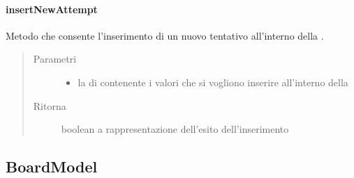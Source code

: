 \documentclass[letterpaper,10pt,italian]{sphinxmanual}
\begin{document}
\paragraph{insertNewAttempt}
\label{\detokenize{source/it/unicam/cs/pa/mastermind/gamecore/BoardController:insertnewattempt}}

\begin{fulllineitems}
\label{\detokenize{source/it/unicam/cs/pa/mastermind/gamecore/BoardController:it.unicam.cs.pa.mastermind.gamecore.BoardController.insertNewAttempt(List)}}
Metodo che consente l’inserimento di un nuovo tentativo all’interno della .
\begin{quote}\begin{description}
\item[{Parametri}] \leavevmode\begin{itemize}
\item {} 
 \textendash{} la  di  contenente i valori che si vogliono inserire all’interno della 

\end{itemize}

\item[{Ritorna}] \leavevmode
boolean a rappresentazione dell’esito dell’inserimento

\end{description}\end{quote}

\end{fulllineitems}



\subsection{BoardModel}
\label{\detokenize{source/it/unicam/cs/pa/mastermind/gamecore/BoardModel:boardmodel}}\label{\detokenize{source/it/unicam/cs/pa/mastermind/gamecore/BoardModel::doc}}
\end{document}
